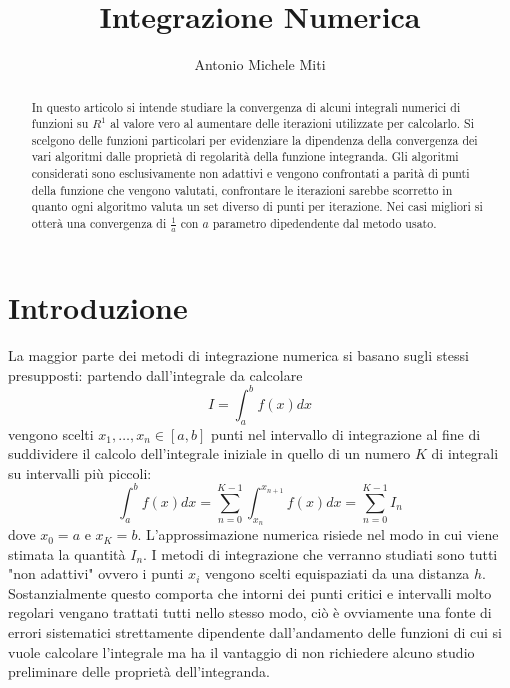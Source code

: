 \documentclass{article}
\title{Integrazione Numerica}
\author{Antonio Michele Miti}
\begin{document}
\maketitle
\begin{abstract}
In questo articolo si intende studiare la convergenza di alcuni integrali numerici di funzioni su $R^{1}$ al valore vero al aumentare delle iterazioni utilizzate per calcolarlo. Si scelgono delle funzioni particolari per evidenziare la dipendenza della convergenza dei vari algoritmi dalle proprietà di regolarità della funzione integranda.
Gli algoritmi considerati sono esclusivamente non adattivi e vengono confrontati a parità di punti della funzione che vengono valutati, confrontare le iterazioni sarebbe scorretto in quanto ogni algoritmo valuta un set diverso di punti per iterazione.
Nei casi migliori si otterà una convergenza di $\frac{1}{a}$ con $a$ parametro dipedendente dal metodo usato.
\end{abstract}

\tableofcontents

\section{Introduzione}
La maggior parte dei metodi di integrazione numerica si basano sugli stessi presupposti:  
partendo dall'integrale da calcolare $$I = \int_{a}^{b}f(x)dx$$ vengono scelti $x_{1},\ldots,x_{n}\in [a,b]$ punti nel intervallo di integrazione al fine di suddividere il calcolo dell'integrale iniziale in quello di un numero $K$ di integrali su intervalli più piccoli: 
	\begin{equation}
	\int_{a}^{b}f(x)dx= \sum_{n=0}^{K-1}\int_{x_{n}}^{x_{n+1}}f(x)dx = \sum_{n=0}^{K-1}I_{n}
	\end{equation}
dove $x_{0}=a$ e $x_{K}=b$.
L'approssimazione numerica risiede nel modo in cui viene stimata la quantità $I_{n}$.
I metodi di integrazione che verranno studiati sono tutti "non adattivi" ovvero i punti $x_{i}$ vengono scelti equispaziati da una distanza $h$. Sostanzialmente questo comporta che intorni dei punti critici e intervalli molto regolari vengano trattati tutti nello stesso modo, ciò è ovviamente una fonte di errori sistematici strettamente dipendente dall'andamento delle funzioni di cui si vuole calcolare l'integrale ma ha il vantaggio di non richiedere alcuno studio preliminare delle proprietà dell'integranda.
\end{document}
